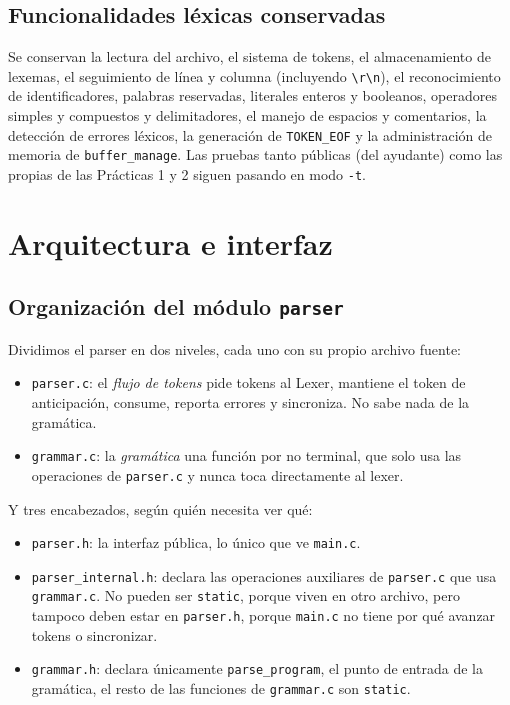 \documentclass[12pt,letterpaper]{article}
\begin{document}
\subsection*{Funcionalidades léxicas conservadas}

Se conservan la lectura del archivo, el sistema de tokens, el almacenamiento de lexemas, el seguimiento de
línea y columna (incluyendo \texttt{\textbackslash r\textbackslash n}), el reconocimiento de identificadores,
palabras reservadas, literales enteros y booleanos, operadores simples y compuestos y delimitadores, el
manejo de espacios y comentarios, la detección de errores léxicos, la generación de \texttt{TOKEN\_EOF} y la
administración de memoria de \texttt{buffer\_manage}. Las pruebas tanto públicas (del ayudante) como las propias
de las Prácticas 1 y 2 siguen pasando en modo \texttt{-t}.


\bigskip


\section*{Arquitectura e interfaz}

\subsection*{Organización del módulo \texttt{parser}}

Dividimos el parser en dos niveles, cada uno con su propio archivo fuente:

\begin{itemize}
\item \texttt{parser.c}: el \emph{flujo de tokens} pide tokens al Lexer, mantiene el token de
  anticipación, consume, reporta errores y sincroniza. No sabe nada de la gramática.
\item \texttt{grammar.c}: la \emph{gramática} una función por no terminal, que solo usa las operaciones de
  \texttt{parser.c} y nunca toca directamente al lexer.
\end{itemize}

Y tres encabezados, según quién necesita ver qué:

\begin{itemize}
\item \texttt{parser.h}: la interfaz pública, lo único que ve \texttt{main.c}.
\item \texttt{parser\_internal.h}: declara las operaciones auxiliares de \texttt{parser.c} que usa
  \texttt{grammar.c}. No pueden ser \texttt{static}, porque viven en otro archivo, pero tampoco deben estar en
  \texttt{parser.h}, porque \texttt{main.c} no tiene por qué avanzar tokens o sincronizar.
\item \texttt{grammar.h}: declara únicamente \texttt{parse\_program}, el punto de entrada de la gramática, el
  resto de las funciones de \texttt{grammar.c} son \texttt{static}.
\end{itemize}
\end{document}
